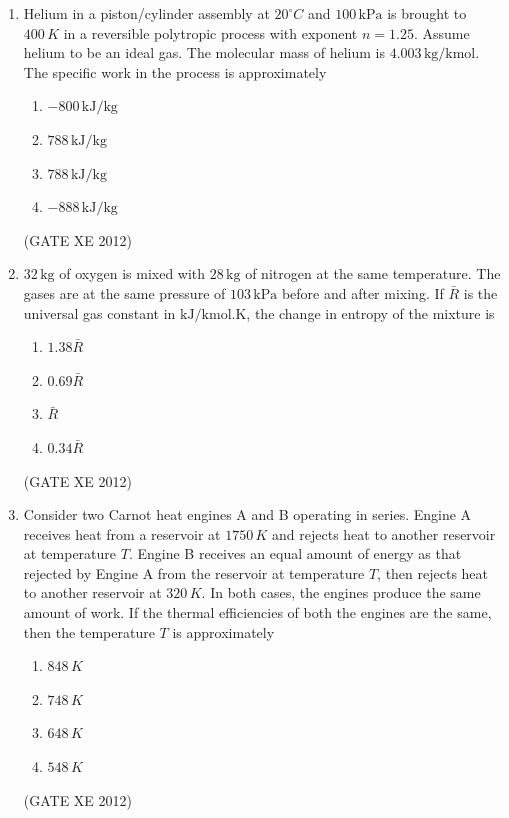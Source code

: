 \documentclass[12pt]{article}
\begin{document}
\begin{enumerate}
\item Helium in a piston/cylinder assembly at $20^{\circ}C$ and $100 \, \text{kPa}$ is brought to $400 \, K$ in a reversible polytropic process with exponent $n = 1.25$. Assume helium to be an ideal gas. The molecular mass of helium is $4.003 \, \text{kg/kmol}$. The specific work in the process is approximately  
\begin{multicols}{4}
\begin{enumerate}
    \item $-800 \, \text{kJ/kg}$  
    \item $788 \, \text{kJ/kg}$  
    \item $788 \, \text{kJ/kg}$  
    \item $-888 \, \text{kJ/kg}$  
\end{enumerate}
\end{multicols}
(GATE XE 2012)

\item $32 \, \text{kg}$ of oxygen is mixed with $28 \, \text{kg}$ of nitrogen at the same temperature. The gases are at the same pressure of $103 \, \text{kPa}$ before and after mixing. If $\bar{R}$ is the universal gas constant in $\text{kJ/kmol.K}$, the change in entropy of the mixture is  
\begin{multicols}{4}
\begin{enumerate}
    \item $1.38\bar{R}$  
    \item $0.69\bar{R}$  
    \item $\bar{R}$  
    \item $0.34\bar{R}$  
\end{enumerate}
\end{multicols}
(GATE XE 2012)

\item Consider two Carnot heat engines A and B operating in series. Engine A receives heat from a reservoir at $1750 \, K$ and rejects heat to another reservoir at temperature $T$. Engine B receives an equal amount of energy as that rejected by Engine A from the reservoir at temperature $T$, then rejects heat to another reservoir at $320 \, K$. In both cases, the engines produce the same amount of work. If the thermal efficiencies of both the engines are the same, then the temperature $T$ is approximately  
\begin{multicols}{4}
\begin{enumerate}
    \item $848 \, K$  
    \item $748 \, K$  
    \item $648 \, K$  
    \item $548 \, K$  
\end{enumerate}
\end{multicols}
(GATE XE 2012)


\end{enumerate}
\end{document}
